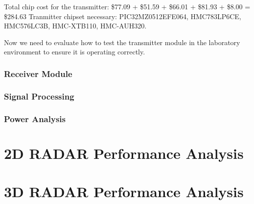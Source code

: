 \documentclass[]{article}
\begin{document}
Total chip cost for the transmitter: \$77.09 + \$51.59 + \$66.01 + \$81.93 + \$8.00 = \$284.63
Tranmitter chipset necessary: PIC32MZ0512EFE064, HMC783LP6CE, HMC576LC3B, HMC-XTB110, HMC-AUH320.

Now we need to evaluate how to test the transmitter module in the laboratory environment to ensure it is operating correctly.

\subsubsection{Receiver Module}

\subsubsection{Signal Processing}

\subsubsection{Power Analysis}

\section{2D RADAR Performance Analysis}

\section{3D RADAR Performance Analysis}
\end{document}

